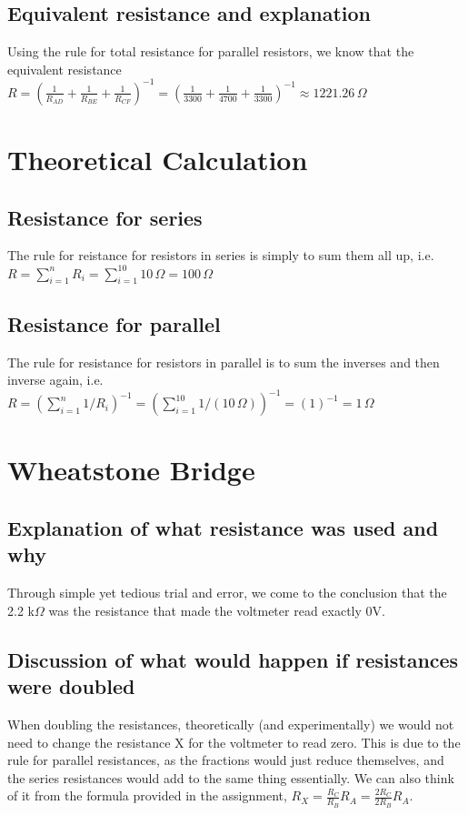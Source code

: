 \documentclass[12pt]{article}
\begin{document}
\subsection{Equivalent resistance and explanation}
Using the rule for total resistance for parallel resistors, we know that the equivalent resistance 
$R = \left(\frac{1}{R_{AD}} + \frac{1}{R_{BE}} + \frac{1}{R_{CF}}\right)^{-1} = 
\left(\frac{1}{3300} + \frac{1}{4700} + \frac{1}{3300}\right)^{-1}
\approx 1221.26 \, \Omega$

\section{Theoretical Calculation}
\subsection{Resistance for series}
The rule for reistance for resistors in series is simply to sum them all up, i.e.
$R = \sum^n_{i=1} R_i = \sum_{i=1}^{10} 10 \, \Omega = 100 \, \Omega$

\subsection{Resistance for parallel}
The rule for resistance for resistors in parallel is to sum the inverses and then inverse again, i.e.
$R = \left(\sum_{i=1}^{n} 1/R_i \right)^{-1} = \left(\sum_{i=1}^{10} 1 / (10 \, \Omega)\right)^{-1} = (1)^{-1} = 1 \, \Omega$

\section{Wheatstone Bridge}
\subsection{Explanation of what resistance was used and why}
Through simple yet tedious trial and error, we come to the conclusion that the 2.2 k$\Omega$ was the resistance
that made the voltmeter read exactly 0V.

\subsection{Discussion of what would happen if resistances were doubled}
When doubling the resistances, theoretically (and experimentally) we would not need to change
the resistance X for the voltmeter to read zero. This is due to the rule for parallel resistances, as the fractions would just
reduce themselves, and the series resistances would add to the same thing essentially. We can also think of it
from the formula provided in the assignment, $R_X = \frac{R_C}{R_B}R_A = \frac{2R_C}{2R_B}R_A$.
\end{document}
